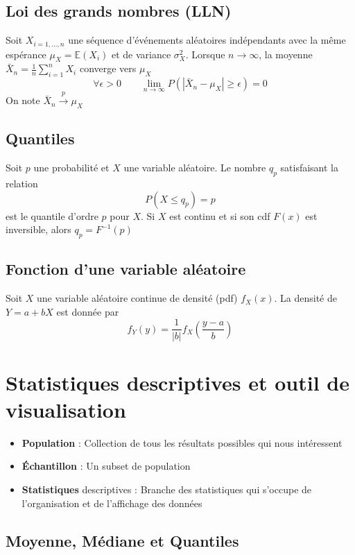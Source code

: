\documentclass[12pt,a4paper]{article}
\begin{document}
\subsection{Loi des grands nombres (LLN)}

Soit $X_{i=1,\dots,n}$ une séquence d'événements aléatoires indépendants avec la même espérance $\mu_X = \mathbb{E}(X_i)$ et de variance $\sigma_X^2$. Lorsque $n\rightarrow \infty$, la moyenne $\bar{X}_n = \frac{1}{n}\sum_{i=1}^n X_i$ converge vers $\mu_X$
$$\forall \epsilon > 0 \qquad \lim_{n\rightarrow \infty} P(|\bar{X}_n - \mu_X| \geq \epsilon) = 0$$
On note $\bar{X}_n \xrightarrow{p} \mu_X$


\subsection{Quantiles}

Soit $p$ une probabilité et $X$ une variable aléatoire. Le nombre $q_p$ satisfaisant la relation
$$P(X \leq q_p) = p$$
est le quantile d'ordre $p$ pour $X$. Si $X$ est continu et si son cdf $F(x)$ est inversible, alors $q_p = F^{-1}(p)$

\subsection{Fonction d'une variable aléatoire}

Soit $X$ une variable aléatoire continue de densité (pdf) $f_X(x)$. La densité de $Y = a + bX$ est donnée par
$$f_Y(y) = \frac{1}{|b|} f_X \left(\frac{y - a}{b}\right)$$


\break

\section{Statistiques descriptives et outil de visualisation}

\begin{itemize}
    \item \textbf{Population} : Collection de tous les résultats possibles qui nous intéressent
    \item \textbf{Échantillon} : Un subset de population
    \item \textbf{Statistiques} descriptives : Branche des statistiques qui s'occupe de l'organisation et de l'affichage des données
\end{itemize}

\subsection{Moyenne, Médiane et Quantiles}
\end{document}
